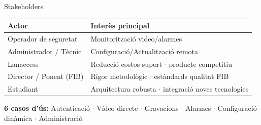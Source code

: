 
\begin{frame}{Stakeholders}
  \vspace{0.4em}
  \begin{center}
  \renewcommand{\arraystretch}{1.55}
  \begin{tabular}{@{}p{}p{}@{}}
    \toprule
    \textbf{Actor} & \textbf{Interès principal} \\
    \midrule
    Operador de seguretat   & Monitorització video/alarmes\\
    Administrador / Tècnic  & Configuració/Actualització remota \\
    Lanaccess               & Reducció costos suport $\cdot$ producte competitiu \\
    Director / Ponent (FIB) & Rigor metodològic $\cdot$ estàndards qualitat FIB \\
    Estudiant               & Arquitectura robusta $\cdot$ integració noves tecnologies \\
    \bottomrule
  \end{tabular}
  \end{center}

  \vspace{0.5em}
  \begin{center}
    \small\textbf{6 casos d'ús:} Autenticació $\cdot$ Vídeo directe $\cdot$ Gravacions $\cdot$ Alarmes $\cdot$ Configuració dinàmica $\cdot$ Administració
  \end{center}
\end{frame}

